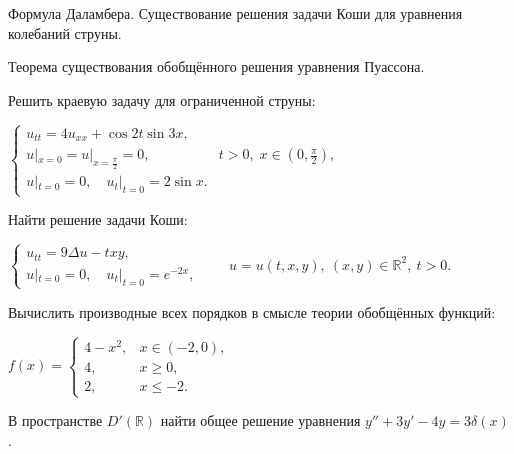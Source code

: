 
\begin{cond}
	Формула Даламбера. Существование решения задачи Коши для уравнения колебаний струны.
\end{cond}

\begin{cond}
	Теорема существования обобщённого решения уравнения Пуассона.
\end{cond}

\begin{cond}
	Решить краевую задачу для ограниченной струны:

	\(
	\begin{cases}
		u_{tt} = 4u_{xx} + \cos 2t \sin 3x,                                                 \\
		u|_{x=0} = u|_{x=\frac{\pi}{2}} = 0, & t > 0,\; x \in \left(0,\frac{\pi}{2}\right), \\
		u|_{t=0} = 0,\quad u_t|_{t=0} = 2\sin x.
	\end{cases}
	\)
\end{cond}

\begin{cond}
	Найти решение задачи Коши:

	\(
	\begin{cases}
		u_{tt} = 9\Delta u - txy, \\
		u|_{t=0} = 0,\quad u_t|_{t=0} = e^{-2x},
	\end{cases}
	\qquad
	u = u(t,x,y),\ (x,y)\in\mathbb{R}^2,\ t>0.
	\)
\end{cond}

\begin{cond}
	Вычислить производные всех порядков в смысле теории обобщённых функций:

	\(
	f(x) =
	\begin{cases}
		4 - x^2, & x \in (-2,0), \\
		4,       & x \ge 0,      \\
		2,       & x \le -2.
	\end{cases}
	\)
\end{cond}

\begin{cond}
	В пространстве \(D'(\mathbb{R})\) найти общее решение уравнения
	$y'' + 3y' - 4y = 3\delta(x)$.
\end{cond}
